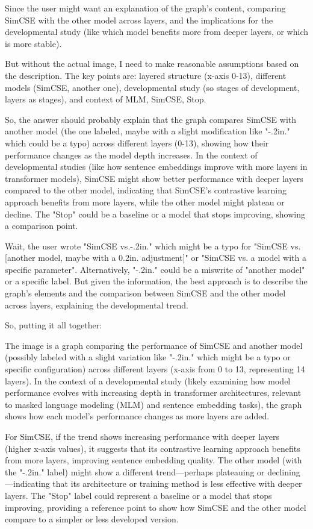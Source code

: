 Since the user might want an explanation of the graph's content, comparing SimCSE with the other model across layers, and the implications for the developmental study (like which model benefits more from deeper layers, or which is more stable).

But without the actual image, I need to make reasonable assumptions based on the description. The key points are: layered structure (x-axis 0-13), different models (SimCSE, another one), developmental study (so stages of development, layers as stages), and context of MLM, SimCSE, Stop.

So, the answer should probably explain that the graph compares SimCSE with another model (the one labeled, maybe with a slight modification like "-.2in." which could be a typo) across different layers (0-13), showing how their performance changes as the model depth increases. In the context of developmental studies (like how sentence embeddings improve with more layers in transformer models), SimCSE might show better performance with deeper layers compared to the other model, indicating that SimCSE's contrastive learning approach benefits from more layers, while the other model might plateau or decline. The "Stop" could be a baseline or a model that stops improving, showing a comparison point.

Wait, the user wrote "SimCSE vs.-.2in." which might be a typo for "SimCSE vs. [another model, maybe with a 0.2in. adjustment]" or "SimCSE vs. a model with a specific parameter". Alternatively, "-.2in." could be a miswrite of "another model" or a specific label. But given the information, the best approach is to describe the graph's elements and the comparison between SimCSE and the other model across layers, explaining the developmental trend.

So, putting it all together:

The image is a graph comparing the performance of SimCSE and another model (possibly labeled with a slight variation like "-.2in." which might be a typo or specific configuration) across different layers (x-axis from 0 to 13, representing 14 layers). In the context of a developmental study (likely examining how model performance evolves with increasing depth in transformer architectures, relevant to masked language modeling (MLM) and sentence embedding tasks), the graph shows how each model's performance changes as more layers are added. 

For SimCSE, if the trend shows increasing performance with deeper layers (higher x-axis values), it suggests that its contrastive learning approach benefits from more layers, improving sentence embedding quality. The other model (with the "-.2in." label) might show a different trend—perhaps plateauing or declining—indicating that its architecture or training method is less effective with deeper layers. The "Stop" label could represent a baseline or a model that stops improving, providing a reference point to show how SimCSE and the other model compare to a simpler or less developed version. 


